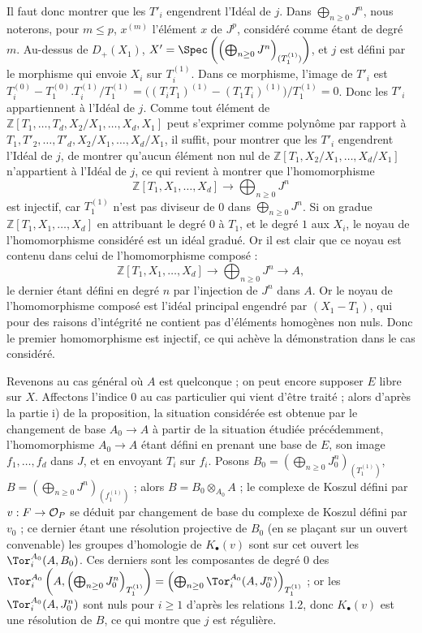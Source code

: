 Il faut donc montrer que les \(T'_i\) engendrent l'Idéal de \(j\). Dans \(\bigoplus_{n\ge0}J^n\), nous noterons, pour \(m\le p\), \(x^{(m)}\) l'élément \(x\) de \(J^p\), considéré comme étant de degré \(m\). Au-dessus de \(D_+(X_1)\), \(X'=\Spec\left(\left(\bigoplus_{n\ge0}J^n\right)_{(T_1^{(1)})}\right)\), et \(j\) est défini par le morphisme qui envoie \(X_i\) sur \(T_i^{(1)}\). Dans ce morphisme, l'image de \(T'_i\) est \(T_i^{(0)}-T_1^{(0)}.T_i^{(1)}/T_1^{(1)}=\bigl((T_iT_1)^{(1)}-(T_1T_i)^{(1)}\bigr)/T_1^{(1)}=0\). Donc les \(T'_i\) appartiennent à l'Idéal de \(j\). Comme tout élément de \(\mathbb Z[T_1,\ldots,T_d,X_2/X_1,\ldots,X_d,X_1]\) peut s'exprimer comme polynôme par rapport à \(T_1,T'_2,\ldots,T'_d,X_2/X_1,\ldots,X_d/X_1\), il suffit, pour montrer que les \(T'_i\) engendrent l'Idéal de \(j\), de montrer qu'aucun élément non nul de \(\mathbb Z[T_1,X_2/X_1,\ldots,X_d/X_1]\) n'appartient à l'Idéal de \(j\), ce qui revient à montrer que l'homomorphisme
\[
\mathbb Z[T_1,X_1,\ldots,X_d]\longrightarrow\bigoplus_{n\ge0}J^n
\]
est injectif, car \(T_1^{(1)}\) n'est pas diviseur de 0 dans \(\bigoplus_{n\ge0}J^n\). Si on gradue \(\mathbb Z[T_1,X_1,\ldots,X_d]\) en attribuant le degré \(0\) à \(T_1\), et le degré \(1\) aux \(X_i\), le noyau de l'homomorphisme considéré est un idéal gradué. Or il est clair que ce
noyau est contenu dans celui de l'homomorphisme composé :
\[
\mathbb Z[T_1,X_1,\ldots,X_d]\longrightarrow
\bigoplus_{n\ge0}J^n\longrightarrow A,
\]
le dernier étant défini en degré \(n\) par l'injection de \(J^n\) dans \(A\). Or le noyau de l'homomorphisme composé est l'idéal principal engendré par \((X_1-T_1)\), qui pour des raisons d'intégrité ne contient pas d'éléments homogènes non nuls. Donc le premier homomorphisme est injectif, ce qui achève la démonstration dans le cas considéré.

Revenons au cas général où \(A\) est quelconque ; on peut encore supposer \(E\) libre sur \(X\). Affectons l'indice \(0\) au cas particulier qui vient d'être traité ; alors d'après la partie i) de la proposition, la situation considérée est obtenue par le changement de base \(A_0\to A\) à partir de la situation étudiée précédemment, l'homomorphisme \(A_0\to A\) étant défini en prenant une base de \(E\), son image \(f_1,\ldots,f_d\) dans \(J\), et en envoyant \(T_i\) sur \(f_i\). Posons \(B_0=\left(\bigoplus_{n\ge0}J_0^n\right)_{(T_1^{(1)})}\), \(B=\left(\bigoplus_{n\ge0}J^n\right)_{(f_1^{(1)})}\) ; alors \(B=B_0\otimes_{A_0}A\) ; le complexe de Koszul défini par \(v:F\to\mathcal O_P\) se déduit par changement de base du complexe de Koszul défini par \(v_0\) ; ce dernier étant une résolution projective de \(B_0\) (en se plaçant sur un ouvert convenable) les groupes d'homologie de \(K_\bullet(v)\) sont sur cet ouvert les \(\Tor_i^{A_0}(A,B_0)\). Ces derniers sont les composantes de degré \(0\) des \(\Tor_i^{A_0}\left(A,\left(\bigoplus_{n\ge0}J_0^n\right)_{T_1^{(1)}}\right)=\left(\bigoplus_{n\ge0}\Tor_i^{A_0}(A,J_0^n)\right)_{T_1^{(1)}}\) ; or les \(\Tor_i^{A_0}(A,J_0^n)\) sont nuls pour \(i\ge1\) d'après les relations 1.2, donc \(K_\bullet(v)\) est une résolution de \(B\), ce qui montre que \(j\) est régulière.

